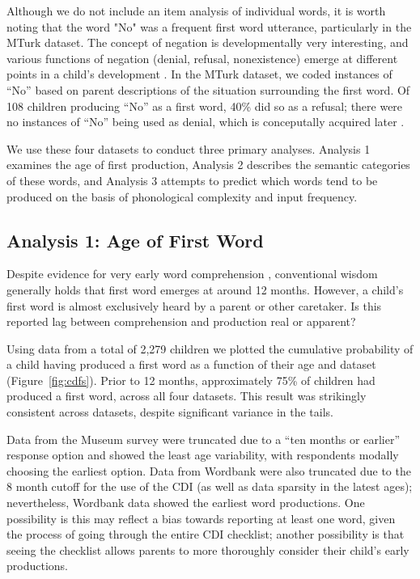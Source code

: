 \documentclass[10pt,letterpaper]{article}
\begin{document}
Although we do not include an item analysis of individual words, it is worth noting that the word "No" was a frequent first word utterance, particularly in the MTurk dataset. The concept of negation is developmentally very interesting, and various functions of negation (denial, refusal, nonexistence) emerge at different points in a child's development \cite{pea1980}. In the MTurk dataset, we coded instances of ``No'' based on parent descriptions of the situation surrounding the first word. Of 108 children producing ``No'' as a first word, 40\% did so as a refusal; there were no instances of ``No'' being used as denial, which is conceputally acquired later \cite{pea1980}. 

We use these four datasets to conduct three primary analyses. Analysis 1 examines the age of first production, Analysis 2 describes the semantic categories of these words, and Analysis 3 attempts to predict which words tend to be produced on the basis of phonological complexity and input frequency.


\subsection{Analysis 1: Age of First Word} 

Despite evidence for very early word comprehension \cite{tincoff1999,tincoff2012,bergelson2012}, conventional wisdom generally holds that first word emerges at around 12 months. However, a child's first word is almost exclusively heard by a parent or other caretaker. Is this reported lag between comprehension and production real or apparent? 

Using data from a total of 2,279 children we plotted the cumulative probability of a child having produced a first word as a function of their age and dataset (Figure~\ref{fig:cdfs}). Prior to 12 months, approximately 75\% of children had produced a first word, across all four datasets. This result was strikingly consistent across datasets, despite significant variance in the tails. 

Data from the Museum survey were truncated due to a ``ten months or earlier'' response option and showed the least age variability, with respondents modally choosing the earliest option. Data from Wordbank were also truncated due to the 8 month cutoff for the use of the CDI (as well as data sparsity in the latest ages); nevertheless, Wordbank data showed the earliest word productions. One possibility is this may reflect a bias towards reporting at least one word, given the process of going through the entire CDI checklist; another possibility is that seeing the checklist allows parents to more thoroughly consider their child's early productions. 
\end{document}
